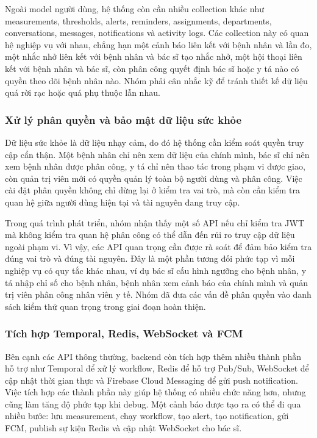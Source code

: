 \par Ngoài model người dùng, hệ thống còn cần nhiều collection khác như measurements, thresholds, alerts, reminders, assignments, departments, conversations, messages, notifications và activity logs. Các collection này có quan hệ nghiệp vụ với nhau, chẳng hạn một cảnh báo liên kết với bệnh nhân và lần đo, một nhắc nhở liên kết với bệnh nhân và bác sĩ tạo nhắc nhở, một hội thoại liên kết với bệnh nhân và bác sĩ, còn phân công quyết định bác sĩ hoặc y tá nào có quyền theo dõi bệnh nhân nào. Nhóm phải cân nhắc kỹ để tránh thiết kế dữ liệu quá rời rạc hoặc quá phụ thuộc lẫn nhau.

\subsubsection{Xử lý phân quyền và bảo mật dữ liệu sức khỏe}
\par Dữ liệu sức khỏe là dữ liệu nhạy cảm, do đó hệ thống cần kiểm soát quyền truy cập cẩn thận. Một bệnh nhân chỉ nên xem dữ liệu của chính mình, bác sĩ chỉ nên xem bệnh nhân được phân công, y tá chỉ nên thao tác trong phạm vi được giao, còn quản trị viên mới có quyền quản lý toàn bộ người dùng và phân công. Việc cài đặt phân quyền không chỉ dừng lại ở kiểm tra vai trò, mà còn cần kiểm tra quan hệ giữa người dùng hiện tại và tài nguyên đang truy cập.

\par Trong quá trình phát triển, nhóm nhận thấy một số API nếu chỉ kiểm tra JWT mà không kiểm tra quan hệ phân công có thể dẫn đến rủi ro truy cập dữ liệu ngoài phạm vi. Vì vậy, các API quan trọng cần được rà soát để đảm bảo kiểm tra đúng vai trò và đúng tài nguyên. Đây là một phần tương đối phức tạp vì mỗi nghiệp vụ có quy tắc khác nhau, ví dụ bác sĩ cấu hình ngưỡng cho bệnh nhân, y tá nhập chỉ số cho bệnh nhân, bệnh nhân xem cảnh báo của chính mình và quản trị viên phân công nhân viên y tế. Nhóm đã đưa các vấn đề phân quyền vào danh sách kiểm thử quan trọng trong giai đoạn hoàn thiện.

\subsubsection{Tích hợp Temporal, Redis, WebSocket và FCM}
\par Bên cạnh các API thông thường, backend còn tích hợp thêm nhiều thành phần hỗ trợ như Temporal để xử lý workflow, Redis để hỗ trợ Pub/Sub, WebSocket để cập nhật thời gian thực và Firebase Cloud Messaging để gửi push notification. Việc tích hợp các thành phần này giúp hệ thống có nhiều chức năng hơn, nhưng cũng làm tăng độ phức tạp khi debug. Một cảnh báo được tạo ra có thể đi qua nhiều bước: lưu measurement, chạy workflow, tạo alert, tạo notification, gửi FCM, publish sự kiện Redis và cập nhật WebSocket cho bác sĩ.

